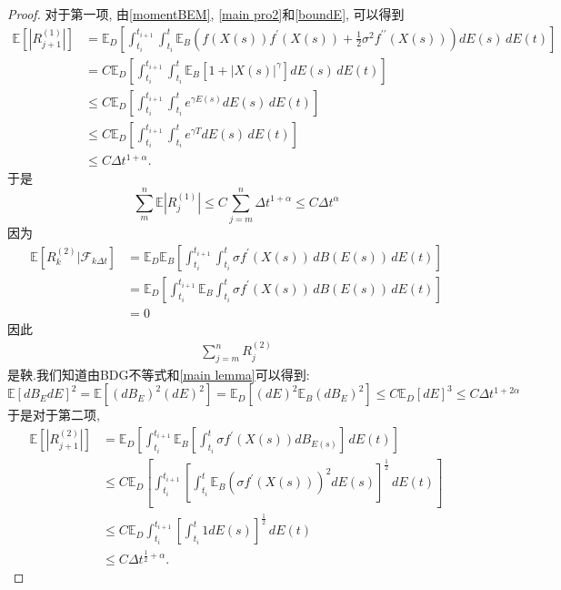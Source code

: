 \begin{proof}
	对于第一项,  由\cref{momentBEM}, \cref{main pro2}和\cref{boundE}, 可以得到
	\begin{align*}
		\mathbb{E} \left[|R_{j+1}^{(1)}| \right] &= \mathbb{E}_D \left[
		\int_{t_i}^{t_{i+1}} \int_{t_i}^{t}  \mathbb{E}_B \left( f(X(s)) f^{\prime}(X(s)) + \frac{1}{2} \sigma^2 f^{\prime\prime}(X(s)) \right) dE(s) \, dE(t)
		\right] \\
		&= C\mathbb{E}_D \left[
		\int_{t_i}^{t_{i+1}} \int_{t_i}^{t}  \mathbb{E}_B \left[1+|X(s)|^{\gamma} \right] dE(s) \, dE(t)
		\right] \\
		& \le C\mathbb{E}_D \left[
		\int_{t_i}^{t_{i+1}} \int_{t_i}^{t}  e^{\gamma E(s)} dE(s) \, dE(t)
		\right] \\
		& \le C\mathbb{E}_D \left[
		\int_{t_i}^{t_{i+1}} \int_{t_i}^{t}  e^{\gamma T} dE(s) \, dE(t)
		\right] \\
		&\le C\Delta t^{1+\alpha}. 
	\end{align*}
	于是
	\begin{equation}
		\sum\limits_{m}^{n}\mathbb{E}\left|R_{j}^{(1)}\right| \leq
		C\sum\limits_{j=m}^{n}\Delta t^{1+\alpha} \le C\Delta t^\alpha
	\end{equation}
	因为
	\begin{align*}
		\mathbb{E}\left[ R_{k}^{(2)}|\mathcal{F}_{k\Delta t} \right] &= \mathbb{E}_D\mathbb{E}_B\left[ \int_{t_i}^{t_{i+1}} \int_{t_i}^{t} \sigma f^{\prime}(X(s)) \, dB(E(s)) \, dE(t) \right]\\
		&=\mathbb{E}_D\left[ \int_{t_i}^{t_{i+1}} \mathbb{E}_B\int_{t_i}^{t} \sigma f^{\prime}(X(s)) \, dB(E(s)) \, dE(t) \right]\\
		&= 0
	\end{align*}
	因此
	\begin{align*}
		\sum_{j=m}^{n}R_{j}^{(2)} 
	\end{align*}
	是鞅.我们知道由BDG不等式和\cref{main lemma}可以得到:
	\begin{equation*}
		\mathbb{E}[dB_EdE]^2=\mathbb{E}[(dB_E)^2(dE)^2]=\mathbb{E}_D[(dE)^2\mathbb{E}_B(dB_E)^2]\leq
		C\mathbb{E}_{D}[dE]^3\leq C\Delta t ^{1+2\alpha}
	\end{equation*}
	于是对于第二项, 
	\begin{align*}
		\mathbb{E} \left[|R_{j+1}^{(2)}| \right] &= \mathbb{E}_D \left[
		\int_{t_i}^{t_{i+1}} \mathbb{E}_B  \left[\int_{t_i}^{t}  \sigma f^{\prime}(X(s)) dB_{E(s)}\right] \, dE(t)
		\right] \\
		& \le C\mathbb{E}_D \left[
		\int_{t_i}^{t_{i+1}} \left[\int_{t_i}^{t}  \mathbb{E}_B\left(\sigma f^{\prime}(X(s))\right)^2 dE(s)\right]^{\frac{1}{2}} \, dE(t)
		\right] \\
		&\le C \mathbb{E}_D 
		\int_{t_i}^{t_{i+1}} \left[\int_{t_i}^{t}  1 dE(s)\right]^{\frac{1}{2}} \, dE(t)\\
		&\le C\Delta t^{\frac{1}{2}+\alpha}. 
	\end{align*}
	

\end{proof}
